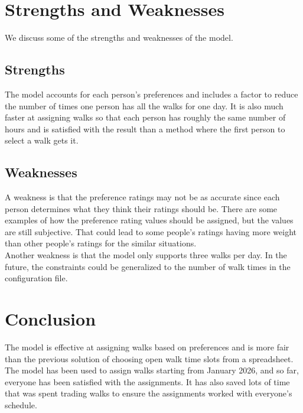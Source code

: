 \documentclass{notes}
\begin{document}
\section*{Strengths and Weaknesses}
We discuss some of the strengths and weaknesses of the model.
\subsection*{Strengths}
The model accounts for each person's preferences and includes a factor to reduce the number of times one person has all the walks for one day. It is also much faster at assigning walks so that each person has roughly the same number of hours and is satisfied with the result than a method where the first person to select a walk gets it.
\subsection*{Weaknesses}
A weakness is that the preference ratings may not be as accurate since each person determines what they think their ratings should be. There are some examples of how the preference rating values should be assigned, but the values are still subjective. That could lead to some people's ratings having more weight than other people's ratings for the similar situations.\\

Another weakness is that the model only supports three walks per day. In the future, the constraints could be generalized to the number of walk times in the configuration file.
\section*{Conclusion}
The model is effective at assigning walks based on preferences and is more fair than the previous solution of choosing open walk time slots from a spreadsheet. The model has been used to assign walks starting from January 2026, and so far, everyone has been satisfied with the assignments. It has also saved lots of time that was spent trading walks to ensure the assignments worked with everyone's schedule.
\end{document}
